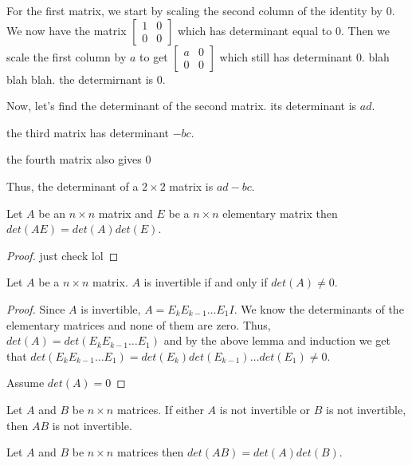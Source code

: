 \begin{example}
    For the first matrix, we start by scaling the second column of the identity by $0$. We now have the matrix $\begin{bmatrix}
        1 & 0\\
        0 & 0
    \end{bmatrix}$ which has determinant equal to $0$. Then we scale the first column by $a$ to get $\begin{bmatrix}
        a & 0\\
        0 & 0
    \end{bmatrix}$ which still has determinant $0$. blah blah blah. the determirnant is 0.

    Now, let's find the determinant of the second matrix. its determinant is $ad$.

    the third matrix has determinant $-bc$.

    the fourth matrix also gives $0$

    Thus, the determinant of a $2\times 2$ matrix is $ad-bc$.
\end{example}
\begin{lemma}
    Let $A$ be an $n\times n$ matrix and $E$ be a $n\times n$ elementary matrix then $det(AE)=det(A)det(E)$.
\end{lemma}
\begin{proof}
    just check lol
\end{proof}
\begin{theorem}
    Let $A$ be a $n\times n$ matrix. $A$ is invertible if and only if $det(A)\neq 0$.
\end{theorem}
\begin{proof}
    Since $A$ is invertible, $A=E_kE_{k-1}\ldots E_1 I$. We know the determinants of the elementary matrices and none of them are zero. Thus, $det(A)=det(E_k E_{k-1}\ldots E_1)$ and by the above lemma and induction we get that $det(E_k E_{k-1}\ldots E_1)=det(E_k)det(E_{k-1})\ldots det(E_1)\neq 0$.

    Assume $det(A)=0$
\end{proof}
\begin{lemma}
    Let $A$ and $B$ be $n\times n$ matrices. If either $A$ is not invertible or $B$ is not invertible, then $AB$ is not invertible.
\end{lemma}
\begin{theorem}
    Let $A$ and $B$ be $n\times n$ matrices then $det(AB)=det(A)det(B)$.
\end{theorem}
